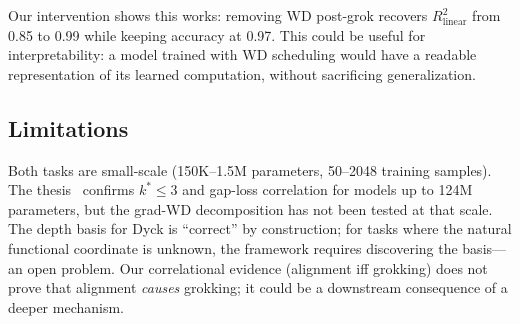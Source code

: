 \documentclass[11pt]{article}
\begin{document}
Our intervention shows this works: removing WD post-grok recovers $R^2_\text{linear}$ from 0.85 to 0.99 while keeping accuracy at 0.97.
This could be useful for interpretability: a model trained with WD scheduling would have a readable representation of its learned computation, without sacrificing generalization.

\subsection{Limitations}

Both tasks are small-scale (150K--1.5M parameters, 50--2048 training samples).
The thesis~\citep{xu2026spectral_edge} confirms $k^* \leq 3$ and gap-loss correlation for models up to 124M parameters, but the grad-WD decomposition has not been tested at that scale.
The depth basis for Dyck is ``correct'' by construction; for tasks where the natural functional coordinate is unknown, the framework requires discovering the basis---an open problem.
Our correlational evidence (alignment iff grokking) does not prove that alignment \emph{causes} grokking; it could be a downstream consequence of a deeper mechanism.


\end{document}
